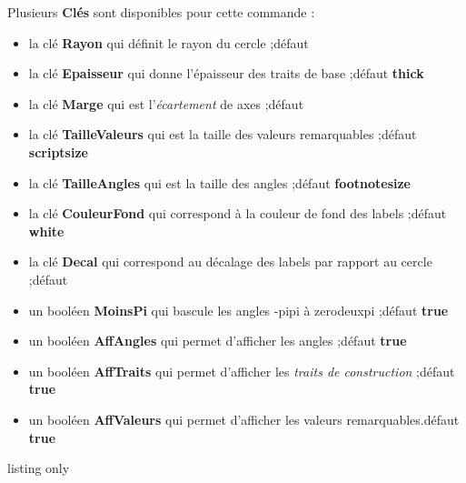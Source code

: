 \documentclass[a4paper,french,11pt]{article}
\newcommand\Cle[1]{{\bfseries\sffamily\textlangle #1\textrangle}}
\begin{document}
\begin{cautionblock}
Plusieurs \Cle{Clés} sont disponibles pour cette commande :

\begin{itemize}
	\item la clé \Cle{Rayon} qui définit le rayon du cercle ;\hfill{}défaut \Cle{3}
	\item la clé \Cle{Epaisseur} qui donne l'épaisseur des traits de base ;\hfill{}défaut \Cle{thick}
	\item la clé \Cle{Marge} qui est l'\textit{écartement} de axes  ;\hfill{}défaut \Cle{0.25}
	\item la clé \Cle{TailleValeurs} qui est la taille des valeurs remarquables ;\hfill{}défaut \Cle{scriptsize}
	\item la clé \Cle{TailleAngles} qui est la taille des angles ;\hfill{}défaut \Cle{footnotesize}
	\item la clé \Cle{CouleurFond} qui correspond à la couleur de fond des labels ;\hfill{}défaut \Cle{white}
	\item la clé \Cle{Decal} qui correspond au décalage des labels par rapport au cercle ;\hfill{}défaut \Cle{10pt}
	\item un booléen \Cle{MoinsPi} qui bascule les angles \og -pipi \fg{} à \og zerodeuxpi \fg{} ;\hfill{}défaut \Cle{true}
	\item un booléen \Cle{AffAngles} qui permet d'afficher les angles ;\hfill{}défaut \Cle{true}
	\item un booléen \Cle{AffTraits} qui permet d'afficher les \textit{traits de construction}  ;\hfill{}défaut \Cle{true}
	\item un booléen \Cle{AffValeurs} qui permet d'afficher les valeurs remarquables.\hfill{}défaut \Cle{true}
\end{itemize}
\vspace*{-\baselineskip}\leavevmode
\end{cautionblock}

\pagebreak

\begin{PresCodeTexPL}{listing only}
\begin{center}
	\begin{tikzpicture}[line join=bevel]
			\CercleTrigo[Rayon=2.5,AffValeurs=false,Decal=8pt]
		\end{tikzpicture}
	~~~~
	\begin{tikzpicture}[line join=bevel]
			\CercleTrigo[Rayon=2.5,AffAngles=false]
		\end{tikzpicture}
	~~~~
	\begin{tikzpicture}[line join=bevel]
			\CercleTrigo[Rayon=2.5,MoinsPi=false,CouleurFond=orange!15]
		\end{tikzpicture}
\end{center}
\end{PresCodeTexPL}
\end{document}
